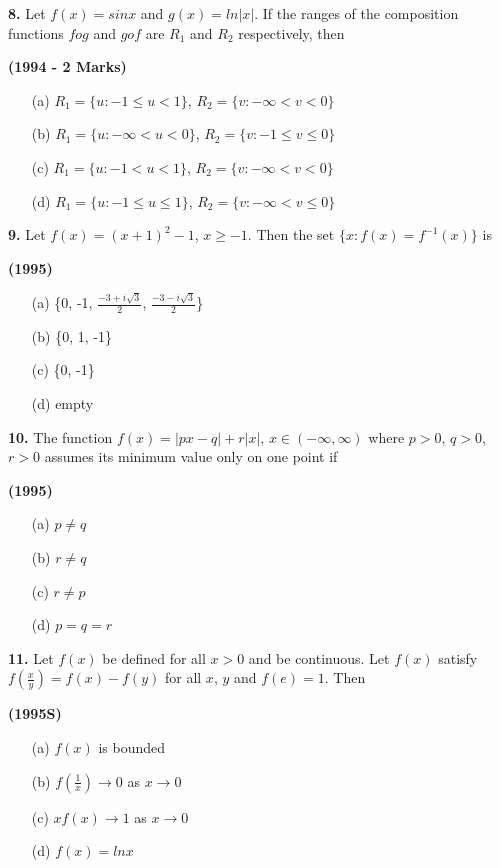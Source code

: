 \documentclass[journal,12pt,twocolumn]{IEEEtran}
\theoremstyle{remark}
\begin{document}
\textbf{8.} Let $f(x)=sinx$ and $g(x)=ln|x|$. If the ranges of the composition functions $fog$ and $gof$ are $R_1$ and $R_2$ respectively, then 

\hfill{\textbf{(1994 - 2 Marks)}}

\begin{enumerate}
\item[(a)] $R_1=\{u:-1\le u<1\}$, $R_2=\{v:-\infty<v<0\}$
\item[(b)] $R_1=\{u:-\infty<u<0\}$, $R_2=\{v:-1\le v\le0\}$
\item[(c)] $R_1=\{u:-1<u<1\}$, $R_2=\{v:-\infty<v<0\}$
\item[(d)] $R_1=\{u:-1\le u\le1\}$, $R_2=\{v:-\infty<v\le0\}$
\end{enumerate}

\textbf{9.} Let $f(x)=(x+1)^{2}-1$, $x\ge-1$. Then the set $\{x:f(x)=f^{-1}(x)\}$ is

\hfil{\textbf{(1995)}}

\begin{enumerate}
\item[(a)] \{0, -1, $\frac{-3+i\sqrt{3}}{2}$, $\frac{-3-i\sqrt{3}}{2}$\}
\item[(b)] \{0, 1, -1\}
\item[(c)] \{0, -1\}
\item[(d)] empty
\end{enumerate}

\textbf{10.} The function $f(x)=|px-q|+r|x|$, $x\in(-\infty,\infty)$ where $p>0$, $q>0$, $r>0$ assumes its minimum value only on one point if

\hfill{\textbf{(1995)}}

\begin{multicols}{2}
	\begin{enumerate}
		\item[(a)] $p\neq q$
		\item[(b)] $r\neq q$
		\item[(c)] $r\neq p$ 
		\item[(d)] $p=q=r$
	\end{enumerate}
\end{multicols}

\textbf{11.} Let $f(x)$ be defined for all $x>0$ and be continuous. Let $f(x)$ satisfy $f\left(\frac{x}{y}\right)=f(x)-f(y)$ for all $x$, $y$ and $f(e)=1$. Then

\hfill{\textbf{(1995S)}}

\begin{multicols}{2}
	\begin{enumerate}
		\item[(a)] $f(x)$ is bounded 
		\item[(b)] $f\left(\frac{1}{x}\right)\to0$ as $x\to0$
		\item[(c)] $xf(x)\to1$ as $x\to0$ 
		\item[(d)] $f(x)=lnx$
	\end{enumerate}
\end{multicols}
\end{document}
